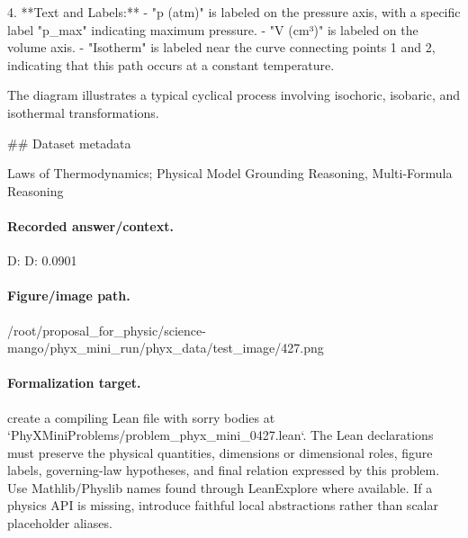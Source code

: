 4. **Text and Labels:**
   - "p (atm)" is labeled on the pressure axis, with a specific label "p\_max" indicating maximum pressure.
   - "V (cm³)" is labeled on the volume axis.
   - "Isotherm" is labeled near the curve connecting points 1 and 2, indicating that this path occurs at a constant temperature.

The diagram illustrates a typical cyclical process involving isochoric, isobaric, and isothermal transformations.

\#\# Dataset metadata

Laws of Thermodynamics; Physical Model Grounding Reasoning, Multi-Formula Reasoning

\paragraph{Recorded answer/context.}
D: D: 0.0901

\paragraph{Figure/image path.}
/root/proposal\_for\_physic/science-mango/phyx\_mini\_run/phyx\_data/test\_image/427.png

\paragraph{Formalization target.}
create a compiling Lean file with sorry bodies at `PhyXMiniProblems/problem\_phyx\_mini\_0427.lean`. The Lean declarations must preserve the physical quantities, dimensions or dimensional roles, figure labels, governing-law hypotheses, and final relation expressed by this problem.
Use Mathlib/Physlib names found through LeanExplore where available. If a physics API is missing, introduce faithful local abstractions rather than scalar placeholder aliases.

